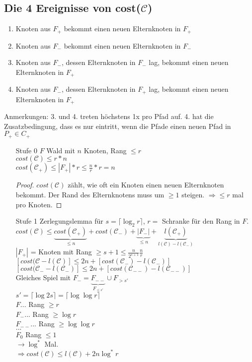 \subsection{Die 4 Ereignisse von cost($\mathcal{C}$)}
\begin{enumerate}
\item Knoten aus $F_+$ bekommt einen neuen Elternknoten in $F_+$
\item Knoten aus $F_-$ bekommt einen neuen Elternknoten in $F_-$
\item Knoten aus $F_-$, dessen Elternknoten in $F_-$ lag, bekommt einen neuen Elternknoten in $F_+$
\item Knoten aus $F_-$, dessen Elternknoten in $F_+$ lag, bekommt einen neuen Elternknoten in $F_+$
\end{enumerate}
Anmerkungen: 3. und 4. treten höchstens 1x pro Pfad auf. 4. hat die Zusatzbedingung, dass es nur eintritt, wenn die Pfade einen neuen Pfad in $P_+ \in C_+$
\begin{enumerate}
\item[Stufe 0] $F$ Wald mit $n$ Knoten, Rang $\leq r$\\
$cost(\mathcal{C}) \leq r * n$\\
$cost(\mathcal{C_+}) \leq |F_+|*r \leq \frac{n}{r}*r = n$
\begin{proof}
$cost(\mathcal{C})$ zählt, wie oft ein Knoten einen neuen Elternknoten bekommt. Der Rand des Elternknotens muss um $\geq 1$ steigen. $\Rightarrow \leq r$ mal pro Knoten.
\end{proof}
\item[Stufe 1] Zerlegungslemma für $s = \lceil \log_2 r \rceil$, $r = $ Schranke für den Rang in $F$.\\
$cost(\mathcal{C}) \leq \underbrace{ cost(\mathcal{C}_+) }_{\leq n}+ cost(\mathcal{C}_-) + \underbrace{ |F_-| }_{\leq n} + \underbrace{ l (\mathcal{C_+}) }_{l(\mathcal{C}) - l (\mathcal{C}_-)}$\\
$|F_+| $ = Knoten mit Rang $\geq s+ 1 \leq \frac{n}{2^{s+1}} \frac{n}{r}$\\
$[cost(\mathcal{C} - l (\mathcal{C})] \leq 2n + [cost(\mathcal{C_-}) - l (\mathcal{C_-})]$\\
$[cost(\mathcal{C}_- - l (\mathcal{C}_-)] \leq 2n + [cost(\mathcal{C_{--}}) - l (\mathcal{C_{--}})]$\\
Gleiches Spiel mit $F_- = \underbrace{F_{--}}_{F_{\leq s'}} \cup F_{> s'} $\\
$s' = \lceil \log 2 s \rceil	= \lceil \log \log r \rceil$\\
$F...$ Rang $\geq r$\\
$F_-...$ Rang $\geq \log r$\\
$F_{--}...$ Rang $\geq \log \log r$\\
$...$\\
$F_0$ Rang $\leq 1$\\ 
$\rightarrow \log^*$ Mal.\\
$\Rightarrow cost(\mathcal{C}) \leq l(\mathcal{C}) + 2n \log^*r$  
\end{enumerate}
